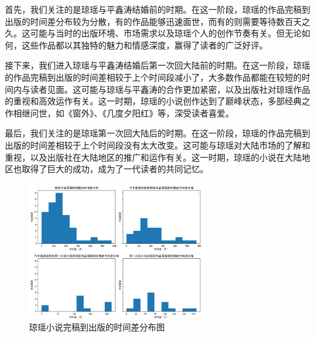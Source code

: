 \documentclass{article}
\begin{document}
首先，我们关注的是琼瑶与平鑫涛结婚前的时期。在这一阶段，琼瑶的作品完稿到出版的时间差分布较为分散，有的作品能够迅速面世，而有的则需要等待数百天之久。这可能与当时的出版环境、市场需求以及琼瑶个人的创作节奏有关。但无论如何，这些作品都以其独特的魅力和情感深度，赢得了读者的广泛好评。

接下来，我们进入琼瑶与平鑫涛结婚后第一次回大陆前的时期。在这一阶段，琼瑶的作品完稿到出版的时间差相较于上个时间段减小了，大多数作品都能在较短的时间内与读者见面。这可能与琼瑶与平鑫涛的合作更加紧密，以及出版社对琼瑶作品的重视和高效运作有关。这一时期，琼瑶的小说创作达到了巅峰状态，多部经典之作相继问世，如《窗外》、《几度夕阳红》等，深受读者喜爱。

最后，我们关注的是琼瑶第一次回大陆后的时期。在这一阶段，琼瑶的作品完稿到出版的时间差相较于上个时间段没有太大改变。这可能与琼瑶对大陆市场的了解和重视，以及出版社在大陆地区的推广和运作有关。这一时期，琼瑶的小说在大陆地区也取得了巨大的成功，成为了一代读者的共同记忆。
\begin{figure}[H] %
\centering %
\includegraphics[width=0.7\textwidth]{pic/pic2} %
\caption{琼瑶小说完稿到出版的时间差分布图} %
\label{Fig.p2} %
\end{figure}
\end{document}
